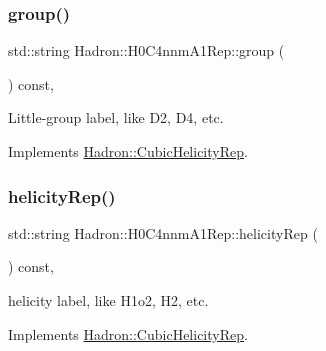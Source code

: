\mbox{\label{structHadron_1_1H0C4nnmA1Rep_a285f5eda1399e94ac66264af1a41c08a}} 
\subsubsection{\texorpdfstring{group()}{group()}\hspace{0.1cm}{\footnotesize\ttfamily [5/5]}}
{\footnotesize\ttfamily std\+::string Hadron\+::\+H0\+C4nnm\+A1\+Rep\+::group (\begin{DoxyParamCaption}{ }\end{DoxyParamCaption}) const\hspace{0.3cm}{\ttfamily [inline]}, {\ttfamily [virtual]}}

Little-\/group label, like D2, D4, etc. 

Implements \mbox{\hyperlink{structHadron_1_1CubicHelicityRep_a101a7d76cd8ccdad0f272db44b766113}{Hadron\+::\+Cubic\+Helicity\+Rep}}.

\mbox{\label{structHadron_1_1H0C4nnmA1Rep_aac6980c132c730c917ea06f915c2cd21}} 
\subsubsection{\texorpdfstring{helicityRep()}{helicityRep()}\hspace{0.1cm}{\footnotesize\ttfamily [1/3]}}
{\footnotesize\ttfamily std\+::string Hadron\+::\+H0\+C4nnm\+A1\+Rep\+::helicity\+Rep (\begin{DoxyParamCaption}{ }\end{DoxyParamCaption}) const\hspace{0.3cm}{\ttfamily [inline]}, {\ttfamily [virtual]}}

helicity label, like H1o2, H2, etc. 

Implements \mbox{\hyperlink{structHadron_1_1CubicHelicityRep_af1096946b7470edf0a55451cc662f231}{Hadron\+::\+Cubic\+Helicity\+Rep}}.

\mbox{\label{structHadron_1_1H0C4nnmA1Rep_aac6980c132c730c917ea06f915c2cd21}} 
